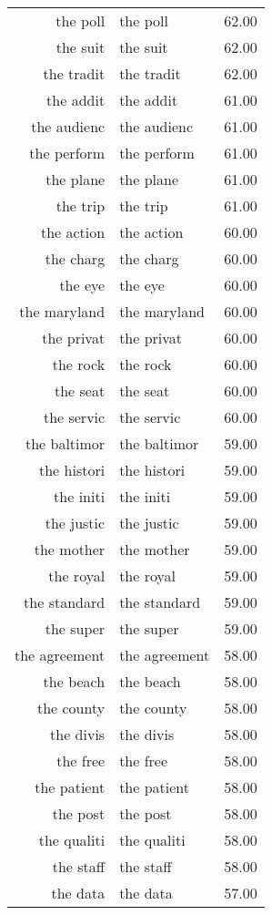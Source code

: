 \begin{table}[ht]
\begin{tabular}{rlr}
  the poll & the poll & 62.00 \\ 
  the suit & the suit & 62.00 \\ 
  the tradit & the tradit & 62.00 \\ 
  the addit & the addit & 61.00 \\ 
  the audienc & the audienc & 61.00 \\ 
  the perform & the perform & 61.00 \\ 
  the plane & the plane & 61.00 \\ 
  the trip & the trip & 61.00 \\ 
  the action & the action & 60.00 \\ 
  the charg & the charg & 60.00 \\ 
  the eye & the eye & 60.00 \\ 
  the maryland & the maryland & 60.00 \\ 
  the privat & the privat & 60.00 \\ 
  the rock & the rock & 60.00 \\ 
  the seat & the seat & 60.00 \\ 
  the servic & the servic & 60.00 \\ 
  the baltimor & the baltimor & 59.00 \\ 
  the histori & the histori & 59.00 \\ 
  the initi & the initi & 59.00 \\ 
  the justic & the justic & 59.00 \\ 
  the mother & the mother & 59.00 \\ 
  the royal & the royal & 59.00 \\ 
  the standard & the standard & 59.00 \\ 
  the super & the super & 59.00 \\ 
  the agreement & the agreement & 58.00 \\ 
  the beach & the beach & 58.00 \\ 
  the county & the county & 58.00 \\ 
  the divis & the divis & 58.00 \\ 
  the free & the free & 58.00 \\ 
  the patient & the patient & 58.00 \\ 
  the post & the post & 58.00 \\ 
  the qualiti & the qualiti & 58.00 \\ 
  the staff & the staff & 58.00 \\ 
  the data & the data & 57.00 \\ 

\end{tabular}
\end{table}
